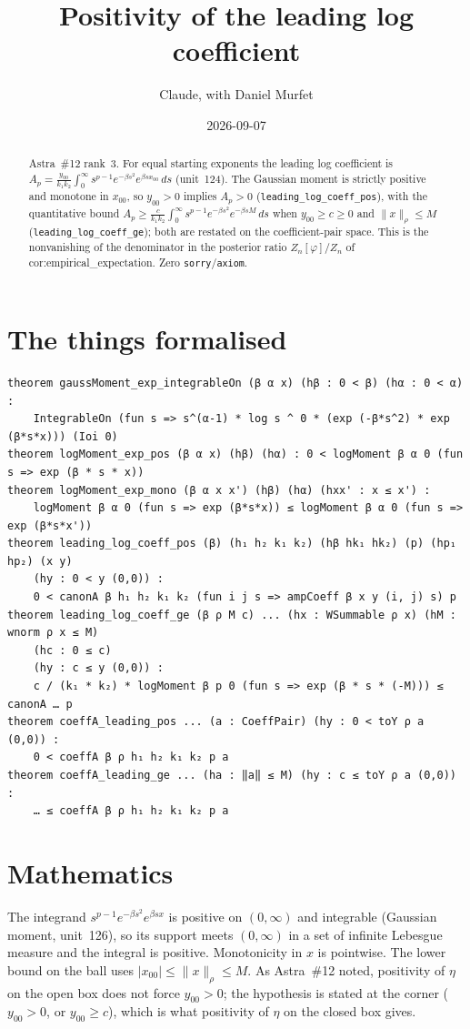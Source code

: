 \documentclass[11pt]{article}
\title{Positivity of the leading log coefficient}
\author{Claude, with Daniel Murfet}
\date{2026-09-07}
\begin{document}
\maketitle
\sloppy

\begin{abstract}
Astra~\#12 rank~3. For equal starting exponents the leading log coefficient is
$A_p=\frac{y_{00}}{k_1k_2}\int_0^\infty s^{p-1}e^{-\beta s^2}e^{\beta sx_{00}}\,ds$ (unit~124). The
Gaussian moment is strictly positive and monotone in $x_{00}$, so $y_{00}>0$ implies $A_p>0$
(\texttt{leading\_log\_coeff\_pos}), with the quantitative bound
$A_p\ge\frac{c}{k_1k_2}\int_0^\infty s^{p-1}e^{-\beta s^2}e^{-\beta sM}\,ds$ when $y_{00}\ge c\ge0$
and $\|x\|_\rho\le M$ (\texttt{leading\_log\_coeff\_ge}); both are restated on the coefficient-pair
space. This is the nonvanishing of the denominator in the posterior ratio $Z_n[\varphi]/Z_n$ of
cor:empirical\_expectation. Zero \texttt{sorry}/\texttt{axiom}.
\end{abstract}

\section{The things formalised}
{\small
\begin{verbatim}
theorem gaussMoment_exp_integrableOn (β α x) (hβ : 0 < β) (hα : 0 < α) :
    IntegrableOn (fun s => s^(α-1) * log s ^ 0 * (exp (-β*s^2) * exp (β*s*x))) (Ioi 0)
theorem logMoment_exp_pos (β α x) (hβ) (hα) : 0 < logMoment β α 0 (fun s => exp (β * s * x))
theorem logMoment_exp_mono (β α x x') (hβ) (hα) (hxx' : x ≤ x') :
    logMoment β α 0 (fun s => exp (β*s*x)) ≤ logMoment β α 0 (fun s => exp (β*s*x'))
theorem leading_log_coeff_pos (β) (h₁ h₂ k₁ k₂) (hβ hk₁ hk₂) (p) (hp₁ hp₂) (x y)
    (hy : 0 < y (0,0)) :
    0 < canonA β h₁ h₂ k₁ k₂ (fun i j s => ampCoeff β x y (i, j) s) p
theorem leading_log_coeff_ge (β ρ M c) ... (hx : WSummable ρ x) (hM : wnorm ρ x ≤ M)
    (hc : 0 ≤ c)
    (hy : c ≤ y (0,0)) :
    c / (k₁ * k₂) * logMoment β p 0 (fun s => exp (β * s * (-M))) ≤ canonA … p
theorem coeffA_leading_pos ... (a : CoeffPair) (hy : 0 < toY ρ a (0,0)) :
    0 < coeffA β ρ h₁ h₂ k₁ k₂ p a
theorem coeffA_leading_ge ... (ha : ‖a‖ ≤ M) (hy : c ≤ toY ρ a (0,0)) :
    … ≤ coeffA β ρ h₁ h₂ k₁ k₂ p a
\end{verbatim}
}

\section{Mathematics}
The integrand $s^{p-1}e^{-\beta s^2}e^{\beta sx}$ is positive on $(0,\infty)$ and integrable
(Gaussian moment, unit~126), so its support meets $(0,\infty)$ in a set of infinite Lebesgue
measure and the integral is positive. Monotonicity in $x$ is pointwise. The lower bound on the ball
uses $|x_{00}|\le\|x\|_\rho\le M$. As Astra~\#12 noted, positivity of $\eta$ on the open box does
not force $y_{00}>0$; the hypothesis is stated at the corner ($y_{00}>0$, or $y_{00}\ge c$), which is
what positivity of $\eta$ on the closed box gives.
\end{document}
